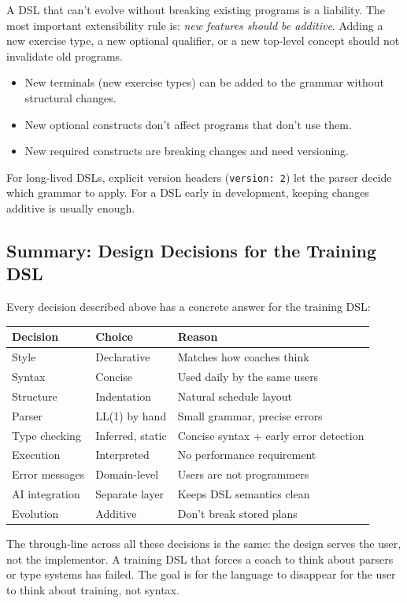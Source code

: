 A DSL that can't evolve without breaking existing programs is a liability. The most
important extensibility rule is: \emph{new features should be additive}. Adding a new
exercise type, a new optional qualifier, or a new top-level concept should not invalidate
old programs.

\begin{itemize}
  \item New terminals (new exercise types) can be added to the grammar without structural
    changes.
  \item New optional constructs don't affect programs that don't use them.
  \item New required constructs are breaking changes and need versioning.
\end{itemize}

For long-lived DSLs, explicit version headers (\texttt{version: 2}) let the parser decide
which grammar to apply. For a DSL early in development, keeping changes additive is usually
enough.

\subsection{Summary: Design Decisions for the Training DSL}

Every decision described above has a concrete answer for the training DSL:

\begin{center}
\begin{tabular}{p{4cm}p{3cm}p{5cm}}
\hline
\textbf{Decision} & \textbf{Choice} & \textbf{Reason} \\
\hline
Style             & Declarative   & Matches how coaches think \\
Syntax            & Concise       & Used daily by the same users \\
Structure         & Indentation   & Natural schedule layout \\
Parser            & LL(1) by hand & Small grammar, precise errors \\
Type checking     & Inferred, static & Concise syntax + early error detection \\
Execution         & Interpreted   & No performance requirement \\
Error messages    & Domain-level  & Users are not programmers \\
AI integration    & Separate layer & Keeps DSL semantics clean \\
Evolution         & Additive      & Don't break stored plans \\
\hline
\end{tabular}
\end{center}

The through-line across all these decisions is the same: the design serves the user, not
the implementor. A training DSL that forces a coach to think about parsers or type systems
has failed. The goal is for the language to disappear for the user to think about
training, not syntax.
